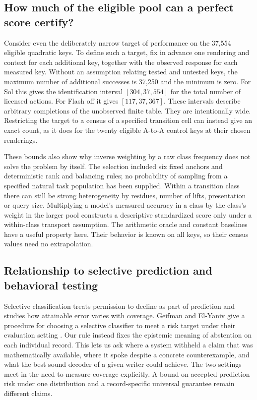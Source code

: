 \documentclass[12pt,letterpaper]{article}
\begin{document}
\subsection{How much of the eligible pool can a perfect score certify?}
Consider even the deliberately narrow target of performance on the 37,554 eligible quadratic keys. To define such a target, fix in advance one rendering and context for each additional key, together with the observed response for each measured key. Without an assumption relating tested and untested keys, the maximum number of additional successes is 37,250 and the minimum is zero. For Sol this gives the identification interval $[304,37{,}554]$ for the total number of licensed actions. For Flash off it gives $[117,37{,}367]$. These intervals describe arbitrary completions of the unobserved finite table. They are intentionally wide. Restricting the target to a census of a specified transition cell can instead give an exact count, as it does for the twenty eligible A-to-A control keys at their chosen renderings.

These bounds also show why inverse weighting by a raw class frequency does not solve the problem by itself. The selection included six fixed anchors and deterministic rank and balancing rules; no probability of sampling from a specified natural task population has been supplied. Within a transition class there can still be strong heterogeneity by residues, number of lifts, presentation or query size. Multiplying a model's measured accuracy in a class by the class's weight in the larger pool constructs a descriptive standardized score only under a within-class transport assumption. The arithmetic oracle and constant baselines have a useful property here. Their behavior is known on all keys, so their census values need no extrapolation.

\subsection{Relationship to selective prediction and behavioral testing}
Selective classification treats permission to decline as part of prediction and studies how attainable error varies with coverage. Geifman and El-Yaniv give a procedure for choosing a selective classifier to meet a risk target under their evaluation setting \cite{selective}. Our rule instead fixes the epistemic meaning of abstention on each individual record. This lets us ask where a system withheld a claim that was mathematically available, where it spoke despite a concrete counterexample, and what the best sound decoder of a given writer could achieve. The two settings meet in the need to measure coverage explicitly. A bound on accepted prediction risk under one distribution and a record-specific universal guarantee remain different claims.
\end{document}
